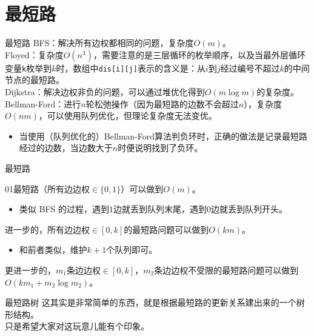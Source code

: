 \documentclass{beamer}
\begin{document}
\section{最短路}
\begin{frame}{最短路}
	BFS：解决所有边权都相同的问题，复杂度$O(m)$。\\
	
	Floyed：复杂度$O(n^3)$，需要注意的是三层循环的枚举顺序，以及当最外层循环变量\texttt{k}枚举到$k$时，数组中\texttt{dis[i][j]}表示的含义是：从$i$到$j$经过编号不超过$k$的中间节点的最短路。\\
	
	Dijkstra：解决边权非负的问题，可以通过堆优化得到$O(m\log m)$的复杂度。\\
	
	Bellman-Ford：进行$n$轮松弛操作（因为最短路的边数不会超过$n$），复杂度$O(nm)$，可以使用队列优化，但理论复杂度无法变优。
	\begin{itemize}
		\item 当使用（队列优化的）Bellman-Ford算法判负环时，正确的做法是记录最短路经过的边数，当边数大于$n$时便说明找到了负环。
	\end{itemize}
\end{frame}
\begin{frame}{最短路}
	
	01最短路（所有边边权$\in \{0,1\}$）可以做到$O(m)$。
	\begin{itemize}
		\item 类似 BFS 的过程，遇到$1$边就丢到队列末尾，遇到$0$边就丢到队列开头。
	\end{itemize}
	\pause
	进一步的，所有边边权$\in [0,k]$的最短路问题可以做到$O(km)$。
	\begin{itemize}
		\item 和前者类似，维护$k+1$个队列即可。
	\end{itemize}
	\pause
	更进一步的，$m_1$条边边权$\in [0, k]$，$m_2$条边边权不受限的最短路问题可以做到$O(km_1 + m_2\log m_2)$。	
	
\end{frame}

\begin{frame}{最短路树}
	这其实是非常简单的东西，就是根据最短路的更新关系建出来的一个树形结构。\\
	
	只是希望大家对这玩意儿能有个印象。
	
\end{frame}
\end{document}

